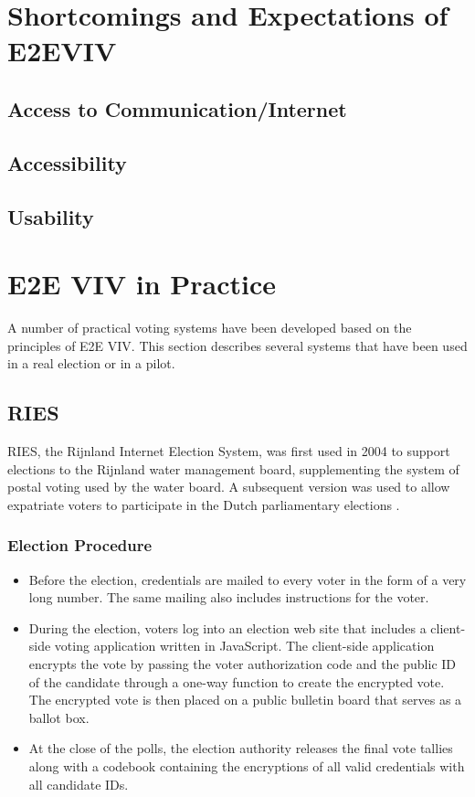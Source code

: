 \section{Shortcomings and Expectations of E2EVIV}
\subsection{Access to Communication/Internet}
\subsection{Accessibility}
\subsection{Usability}
\section{E2E VIV in Practice}

A number of practical voting systems have been developed based on the
principles of E2E VIV. This section describes several systems that
have been used in a real election or in a pilot.


\subsection{RIES~\cite{hubbers2004}}

RIES, the Rijnland Internet Election System, was first used in 2004 to
support elections to the Rijnland water management board,
supplementing the system of postal voting used by the water board. A
subsequent version was used to allow expatriate voters to participate
in the Dutch parliamentary elections \cite{gonggrijp2009}.

\subsubsection{Election Procedure}

\begin{itemize}

\item Before the election, credentials are mailed to every voter in
  the form of a very long number. The same mailing also includes
  instructions for the voter.

\item During the election, voters log into an election web site that
  includes a client-side voting application written in JavaScript. The
  client-side application encrypts the vote by passing the voter
  authorization code and the public ID of the candidate through a
  one-way function to create the encrypted vote. The encrypted vote
  is then placed on a public bulletin board that serves as a ballot
  box.

\item At the close of the polls, the election authority releases the
  final vote tallies along with a codebook containing the encryptions
  of all valid credentials with all candidate IDs.

\end{itemize}


